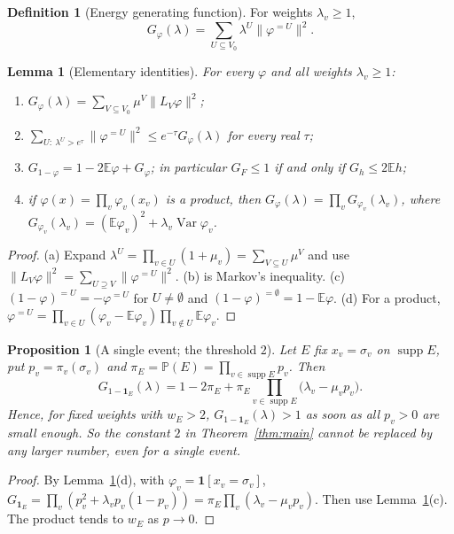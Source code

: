 \documentclass[11pt,reqno]{amsart}
\newtheorem{lemma}[theorem]{Lemma}
\newtheorem{proposition}[theorem]{Proposition}
\theoremstyle{definition}
\newtheorem{definition}[theorem]{Definition}
\newcommand{\E}{\mathbb E}
\newcommand{\PP}{\mathbb P}
\newcommand{\supp}{\operatorname{supp}}
\begin{document}
\begin{definition}[Energy generating function]
For weights $\lambda_v\ge1$,
\[
 G_\varphi(\lambda)=\sum_{U\subseteq V_0}\lambda^U\|\varphi^{=U}\|^2 .
\]
\end{definition}

\begin{lemma}[Elementary identities]\label{lem:ident}
For every $\varphi$ and all weights $\lambda_v\ge1$:
\begin{enumerate}
\item[(a)] $G_\varphi(\lambda)=\sum_{V\subseteq V_0}\mu^V\|L_V\varphi\|^2$;
\item[(b)] $\sum_{U:\ \lambda^U>e^\tau}\|\varphi^{=U}\|^2\le e^{-\tau}G_\varphi(\lambda)$ for every real $\tau$;
\item[(c)] $G_{1-\varphi}=1-2\E\varphi+G_\varphi$; in particular $G_F\le1$ if and only if
$G_h\le2\E h$;
\item[(d)] if $\varphi(x)=\prod_{v}\varphi_v(x_v)$ is a product, then
$G_\varphi(\lambda)=\prod_vG_{\varphi_v}(\lambda_v)$, where $G_{\varphi_v}(\lambda_v)=(\E\varphi_v)^2+\lambda_v\operatorname{Var}\varphi_v$.
\end{enumerate}
\end{lemma}

\begin{proof}
(a) Expand $\lambda^U=\prod_{v\in U}(1+\mu_v)=\sum_{V\subseteq U}\mu^V$ and use
$\|L_V\varphi\|^2=\sum_{U\supseteq V}\|\varphi^{=U}\|^2$.  (b) is Markov's inequality.
(c) $(1-\varphi)^{=U}=-\varphi^{=U}$ for $U\ne\emptyset$ and $(1-\varphi)^{=\emptyset}=1-\E\varphi$.
(d) For a product, $\varphi^{=U}=\prod_{v\in U}(\varphi_v-\E\varphi_v)\prod_{v\notin U}\E\varphi_v$.
\end{proof}

\begin{proposition}[A single event; the threshold $2$]\label{prop:single}
Let $E$ fix $x_v=\sigma_v$ on $\supp E$, put $p_v=\pi_v(\sigma_v)$ and
$\pi_E=\PP(E)=\prod_{v\in\supp E}p_v$.  Then
\[
 G_{1-\mathbf 1_E}(\lambda)=1-2\pi_E+\pi_E\prod_{v\in\supp E}\big(\lambda_v-\mu_vp_v\big).
\]
Hence, for fixed weights with $w_E>2$, $G_{1-\mathbf 1_E}(\lambda)>1$ as soon as all
$p_v>0$ are small enough.  So the constant $2$ in Theorem~\ref{thm:main}
cannot be replaced by any larger number, even for a single event.
\end{proposition}

\begin{proof}
By Lemma~\ref{lem:ident}(d), with $\varphi_v=\mathbf 1[x_v=\sigma_v]$,
$G_{\mathbf 1_E}=\prod_v(p_v^2+\lambda_vp_v(1-p_v))=\pi_E\prod_v(\lambda_v-\mu_vp_v)$.  Then use
Lemma~\ref{lem:ident}(c).  The product tends to $w_E$ as $p\to0$.
\end{proof}
\end{document}

